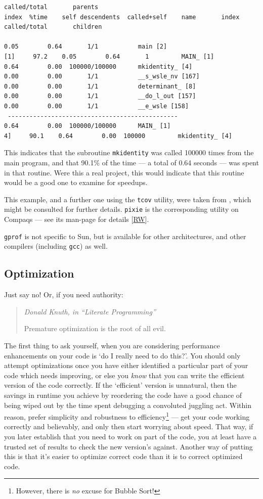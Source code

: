 \documentclass[11pt,oneside,chapters]{starlink}
\begin{document}
\begin{verbatim}
called/total       parents
index  %time    self descendents  called+self    name    	index
called/total       children

0.05        0.64       1/1           main [2]
[1]     97.2    0.05        0.64       1         MAIN_ [1]
0.64        0.00  100000/100000      mkidentity_ [4]
0.00        0.00       1/1           __s_wsle_nv [167]
0.00        0.00       1/1           determinant_ [8]
0.00        0.00       1/1           __do_l_out [157]
0.00        0.00       1/1           __e_wsle [158]
 -----------------------------------------------
0.64        0.00  100000/100000      MAIN_ [1]
4]     90.1    0.64        0.00  100000         mkidentity_ [4]
\end{verbatim}

This indicates that the subroutine \texttt{mkidentity}
was called 100000 times from the main program, and that
90.1\% of the time --- a total of 0.64 seconds --- was spent
in that routine.  Were this a real project, this would
indicate that this routine would be a good one to examine
for speedups.

This example, and a further one using the
\texttt{tcov} utility, were taken from
\citet{sunf77}, which might be consulted for
further details.  \texttt{pixie} is the corresponding
utility on Compaqs --- see its man-page for details
[\hyperlink{ta:rw}{RW}].

\texttt{gprof} is not specific to Sun, but is
available for other architectures, and other compilers
(including \texttt{gcc}) as well.


\subsection{Optimization}
\label{s:optim}

Just say no!  Or, if you need authority:

\begin{quotation}
\emph{Donald Knuth, in ``Literate Programming''}

Premature optimization is the root of all evil.
\end{quotation}

The first thing to ask yourself, when you are considering
performance enhancements on your code is `do I really need
to do this?'.  You should only attempt optimizations once
you have either identified a particular part of your code
which needs improving, or else you \emph{know} that you
can write the efficient version of the code correctly.  If
the `efficient' version is unnatural, then the savings in
runtime you achieve by reordering the code have a good
chance of being wiped out by the time spent debugging a
convoluted juggling act.  Within reason, prefer simplicity
and robustness to efficiency\footnote{However, there is
\emph{no} excuse for Bubble Sort!} --- get
your code working correctly and believably, and only then
start worrying about speed.  That way, if you later
establish that you need to work on part of the code, you
at least have a trusted set of results to check the new
version's against.  Another way of putting this is that
it's easier to optimize correct code than it is to correct
optimized code.
\end{document}
